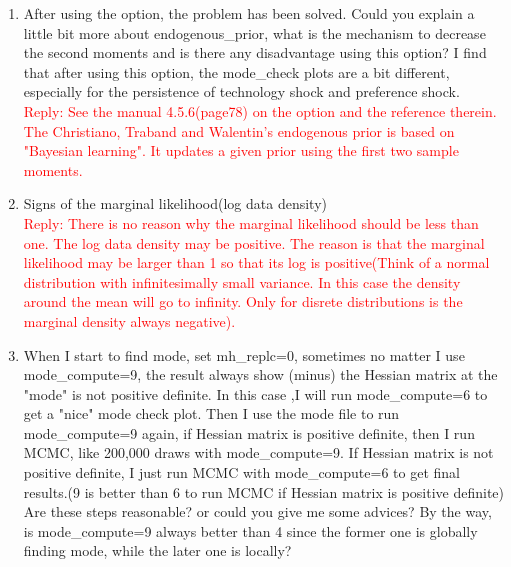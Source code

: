 \documentclass[cn,10pt,math=newtx,citestyle=gb7714-2015,bibstyle=gb7714-2015]{elegantbook}
\begin{document}
{{\begin{enumerate}
		$$y\_obs=y-y(-1)+y\_ME$$
		$$c\_obs=c-c(-1)+y\_ME$$
		$$i\_obs=i-i(-1)$$
		$$h\_obs=h$$
		The measurement equation for one-side HP  filtered data(cyclical component):
		$$y\_obs=y+y\_ME$$
		$$c\_obs=c$$
		$$i\_obs=i$$
		$$h\_obs=h$$
		both model second moments are much larger than corresponding data second0 moments.\\
		\textcolor{red}{Reply: Unfortunately, this is not entirely unheard of. In Born, Peter and Pfeifer(2013) "Fiscal news and macroeconomic volatility", they use the endogenous\_prior option for this reason. You should  try whether this helps. If yes, the actual estimation might be fine.}
		\item After using the option, the problem has been solved. Could you explain a little bit more about endogenous\_prior, what is the mechanism to decrease the second moments and is there any disadvantage using this option? I find that after using this option, the mode\_check plots are a bit different, especially for the persistence of technology shock and preference shock.\\
		\textcolor{red}{Reply: See the manual 4.5.6(page78) on the option and the reference therein. The Christiano, Traband and Walentin's endogenous prior is based on "Bayesian learning". It updates a given prior using the first two sample moments.}
		\item Signs of the marginal likelihood(log data density)\\
		\textcolor{red}{Reply: There is no reason why the marginal likelihood should be less than one. The log data density may be positive. The reason is that the marginal likelihood may be larger than 1 so that its log is positive(Think of a normal distribution with infinitesimally small variance. In this case the density around the mean will go to infinity. Only for disrete distributions is the marginal density always negative).}
		\item When I start to find mode, set mh\_replc=0, sometimes no matter I use mode\_compute=9, the result always show (minus) the Hessian matrix at the "mode" is not positive definite. In this case ,I will run mode\_compute=6 to get a "nice" mode check plot. Then I use the mode file to run mode\_compute=9 again, if Hessian matrix is positive definite, then I run MCMC, like 200,000 draws with mode\_compute=9. If Hessian matrix is not positive definite, I just run MCMC with mode\_compute=6 to get final results.(9 is better than 6 to run MCMC if Hessian matrix is positive definite) Are these steps reasonable? or could you give me some advices? By the way, is mode\_compute=9 always better than 4 since the former one is globally finding mode, while the later one is locally?\\

\end{enumerate}}}
\end{document}
